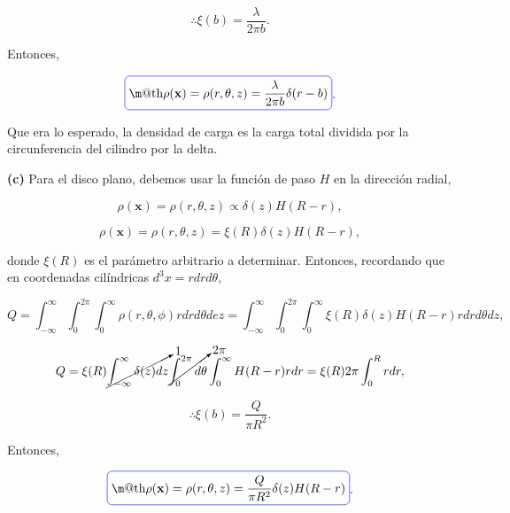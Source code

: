 \documentclass[a4paper,11pt]{article}
\makeatletter
\numberwithin{equation}{section}
\newcommand*{\boxcolor}{blue}
\renewcommand{\boxed}[1]{\textcolor{\boxcolor}{%
\tikz[baseline={([yshift=-1ex]current bounding box.center)}] \node [rectangle, minimum width=1ex,rounded corners,draw] {\normalcolor\m@th$\displaystyle#1$};}}
\makeatother
\begin{document}
\begin{equation}
 \therefore \xi(b) = \frac{\lambda}{2\pi b}.
\end{equation}

Entonces, 

\begin{equation}
 \boxed{\rho(\mathbf{x}) =  \rho(r,\theta,z) = \frac{\lambda}{2\pi b}\delta(r - b)}.
\end{equation}

Que era lo esperado, la densidad de carga es la carga total dividida por la circunferencia 
del cilindro por la delta.

\vspace{.3cm}

\textbf{(c)} Para el disco plano, debemos usar la función de paso $H$ en la dirección 
radial, 

\begin{equation}
 \rho(\mathbf{x}) =  \rho(r,\theta,z) \propto \delta(z)H(R-r),
\end{equation}

\begin{equation}
 \rho(\mathbf{x}) =  \rho(r,\theta,z) = \xi(R) \delta(z)H(R-r),
\end{equation}

donde $\xi(R)$ es el parámetro arbitrario a determinar. Entonces, recordando que 
en coordenadas cilíndricas $d^3x = rdr d\theta$, 

\begin{equation*}
 Q = \int_{-\infty}^{\infty}\int_0^{2\pi} \int_0^\infty 
  \rho(r,\theta,\phi) rdr d\theta dez = 
  \int_{-\infty}^{\infty} \int_0^{2\pi} \int_0^\infty \xi(R) \delta(z)H(R-r)
  r drd\theta dz,
\end{equation*}

\begin{equation}
 Q = \xi(R) \cancelto{1}{\int_{-\infty}^{\infty} \delta(z)dz} 
 \cancelto{2\pi}{\int_0^{2\pi} d\theta}
 \int_0^\infty H(R-r) r dr = \xi(R) 2\pi \int_0^R rdr,
\end{equation}

\begin{equation}
 \therefore \xi(b) = \frac{Q}{\pi R^2}.
\end{equation}

Entonces, 

\begin{equation}
 \boxed{\rho(\mathbf{x}) =  \rho(r,\theta,z) = \frac{Q}{\pi R^2}\delta(z)H(R-r)}.
\end{equation}
\end{document}
